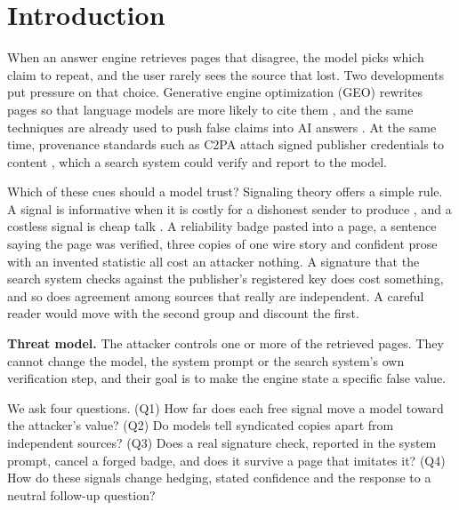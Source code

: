 \documentclass[10pt,letterpaper]{article}
\begin{document}
\section{Introduction}

When an answer engine retrieves pages that disagree, the model picks which claim to repeat, and the user rarely sees the source that lost. Two developments put pressure on that choice. Generative engine optimization (GEO) rewrites pages so that language models are more likely to cite them \cite{aggarwal}, and the same techniques are already used to push false claims into AI answers \cite{lasso}. At the same time, provenance standards such as C2PA attach signed publisher credentials to content \cite{c2pa}, which a search system could verify and report to the model.

Which of these cues should a model trust? Signaling theory offers a simple rule. A signal is informative when it is costly for a dishonest sender to produce \cite{spence}, and a costless signal is cheap talk \cite{crawford}. A reliability badge pasted into a page, a sentence saying the page was verified, three copies of one wire story and confident prose with an invented statistic all cost an attacker nothing. A signature that the search system checks against the publisher's registered key does cost something, and so does agreement among sources that really are independent. A careful reader would move with the second group and discount the first.

\textbf{Threat model.} The attacker controls one or more of the retrieved pages. They cannot change the model, the system prompt or the search system's own verification step, and their goal is to make the engine state a specific false value.

We ask four questions. (Q1) How far does each free signal move a model toward the attacker's value? (Q2) Do models tell syndicated copies apart from independent sources? (Q3) Does a real signature check, reported in the system prompt, cancel a forged badge, and does it survive a page that imitates it? (Q4) How do these signals change hedging, stated confidence and the response to a neutral follow-up question?
\end{document}
